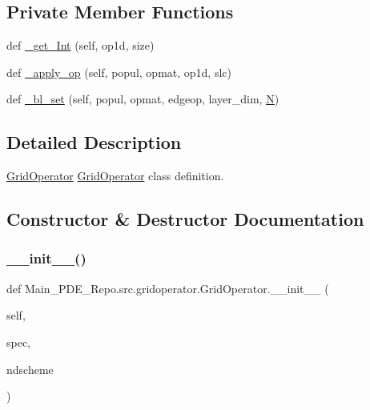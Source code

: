 \subsection*{Private Member Functions}
\begin{DoxyCompactItemize}
\item 
def \hyperlink{classMain__PDE__Repo_1_1src_1_1gridoperator_1_1GridOperator_a1dcfb3ac8b3fe0c540a6ef788ea5f0a1}{\+\_\+get\+\_\+\+Int} (self, op1d, size)
\item 
def \hyperlink{classMain__PDE__Repo_1_1src_1_1gridoperator_1_1GridOperator_a33da253271c9dcc762ba0e728453d77e}{\+\_\+apply\+\_\+op} (self, popul, opmat, op1d, slc)
\item 
def \hyperlink{classMain__PDE__Repo_1_1src_1_1gridoperator_1_1GridOperator_ab0568659ff00ab8eb6249eb188bc00eb}{\+\_\+bl\+\_\+set} (self, popul, opmat, edgeop, layer\+\_\+dim, \hyperlink{classMain__PDE__Repo_1_1src_1_1gridoperator_1_1GridOperator_a2d253ceb81a2b90bc7b7e1231aeb79c5}{N})
\end{DoxyCompactItemize}


\subsection{Detailed Description}
\hyperlink{classMain__PDE__Repo_1_1src_1_1gridoperator_1_1GridOperator}{Grid\+Operator} \hyperlink{classMain__PDE__Repo_1_1src_1_1gridoperator_1_1GridOperator}{Grid\+Operator} class definition. 

\subsection{Constructor \& Destructor Documentation}
\mbox{\label{classMain__PDE__Repo_1_1src_1_1gridoperator_1_1GridOperator_a874aaa760371b08e21431b13fd615dfc}} 
\subsubsection{\texorpdfstring{\+\_\+\+\_\+init\+\_\+\+\_\+()}{\_\_init\_\_()}}
{\footnotesize\ttfamily def Main\+\_\+\+P\+D\+E\+\_\+\+Repo.\+src.\+gridoperator.\+Grid\+Operator.\+\_\+\+\_\+init\+\_\+\+\_\+ (\begin{DoxyParamCaption}\item[{}]{self,  }\item[{}]{spec,  }\item[{}]{ndscheme }\end{DoxyParamCaption})}



